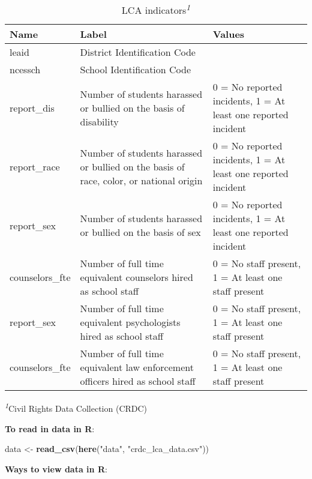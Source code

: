 \documentclass[
]{book}
\newenvironment{Shaded}{\begin{snugshade}}{\end{snugshade}}
\newcommand{\FunctionTok}[1]{\textcolor[rgb]{0.13,0.29,0.53}{\textbf{#1}}}
\newcommand{\NormalTok}[1]{#1}
\newcommand{\OtherTok}[1]{\textcolor[rgb]{0.56,0.35,0.01}{#1}}
\newcommand{\StringTok}[1]{\textcolor[rgb]{0.31,0.60,0.02}{#1}}
\begin{document}
\begin{table}[!t]
\caption*{
{\large LCA indicators\textsuperscript{\textit{1}}}
} 
\fontsize{12.0pt}{14.4pt}\selectfont
\begin{tabular*}{0.75\linewidth}{@{\extracolsep{\fill}}lll}
\toprule
Name & Label & Values \\ 
\midrule\addlinespace[2.5pt]
leaid & District Identification Code &  \\ 
ncessch & School Identification Code &  \\ 
report\_dis & Number of students harassed or bullied on the basis of disability & 0 = No reported incidents, 1 = At least one reported incident \\ 
report\_race & Number of students harassed or bullied on the basis of race, color, or national origin & 0 = No reported incidents, 1 = At least one reported incident \\ 
report\_sex & Number of students harassed or bullied on the basis of sex & 0 = No reported incidents, 1 = At least one reported incident \\ 
counselors\_fte & Number of full time equivalent counselors hired as school staff & 0 = No staff present, 1 = At least one staff present \\ 
report\_sex & Number of full time equivalent psychologists hired as school staff & 0 = No staff present, 1 = At least one staff present \\ 
counselors\_fte & Number of full time equivalent law enforcement officers hired as school staff & 0 = No staff present, 1 = At least one staff present \\ 
\bottomrule
\end{tabular*}
\begin{minipage}{\linewidth}
\textsuperscript{\textit{1}}Civil Rights Data Collection (CRDC)\\
\end{minipage}
\end{table}

\textbf{To read in data in R}:

\begin{Shaded}
\begin{Highlighting}[]
\NormalTok{data }\OtherTok{\textless{}{-}} \FunctionTok{read\_csv}\NormalTok{(}\FunctionTok{here}\NormalTok{(}\StringTok{"data"}\NormalTok{, }\StringTok{"crdc\_lca\_data.csv"}\NormalTok{)) }
\end{Highlighting}
\end{Shaded}

\textbf{Ways to view data in R}:
\end{document}
